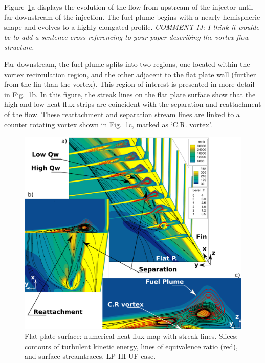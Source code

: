 \documentclass{AIAA}
\begin{document}
Figure~\ref{fig:Exper_Flowf}a displays the evolution of the flow from upstream of the injector until far downstream of  the injection.
The fuel plume begins with a nearly hemispheric shape and evolves to a highly elongated profile.
{\it COMMENT IJ: I think it woulde be to add a sentence cross-referencing to your paper describing the vortex flow structure.}
 
Far downstream, the fuel plume splits into two regions, one located within the vortex recirculation region, and the other adjacent to the flat plate wall (further from the fin than the vortex).
This region of interest is presented in more detail in Fig.~\ref{fig:Exper_Flowf}b.
In this figure, the streak lines on the flat plate surface show that the high and low heat flux strips are coincident with the separation and reattachment of the flow.
These reattachment and separation stream lines are linked to a counter rotating vortex shown in Fig.~\ref{fig:Exper_Flowf}c, marked as `C.R. vortex'.


\begin{figure}[!h]
\center
\includegraphics[trim = 0mm 0mm 0mm 0mm, clip, width=0.95\columnwidth,valign=t]{Figures/Flowfield_Experimental_Vred_V2.pdf}
\caption{Flat plate surface: numerical heat flux map with streak-lines. Slices: contours of turbulent kinetic energy, lines of equivalence ratio (red), and surface streamtraces. LP-HI-UF case.}
\label{fig:Exper_Flowf}
\end{figure} 
\end{document}
